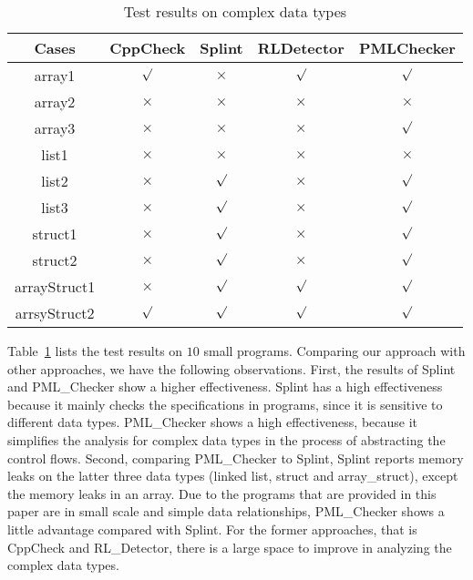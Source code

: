 \begin{table}[!h]
\center
\caption{Test results on complex data types}\label{tab:8}
\begin{tabular}{|c|c|c|c|c|}
\hline
\textbf{Cases}  & \textbf{CppCheck} & \textbf{Splint} & \textbf{RLDetector} & \textbf{PMLChecker}\\
\hline
array1	 &	$\surd$ & $\times$ & $\surd$ & $\surd$\\
\hline
array2  & $\times$ & $\times$ & $\times$ & $\times$ \\
\hline
array3	 & $\times$ &	$\times$ & $\times$ & $\surd$\\
\hline
list1 	& $\times$ &$\times$ & $\times$ & $\times$\\
\hline
list2	 & $\times$ & $\surd$ & $\times$ & $\surd$\\
\hline
list3	 &	$\times$	& $\surd$ & $\times$ & $\surd$\\
\hline
struct1	 & $\times$ & $\surd$ & $\times$ & $\surd$\\
\hline
struct2	 & $\times$ & $\surd$ & $\times$ & $\surd$\\
\hline
arrayStruct1	 & $\times$ & $\surd$ & $\surd$ & $\surd$\\
\hline
arrsyStruct2  & $\surd$ & $\surd$ & $\surd$& $\surd$\\
\hline
\end{tabular}
\end{table}


Table~\ref{tab:8} lists the test results on $10$ small programs. Comparing our approach with other approaches, we have the following observations.
First, %
the results of Splint and PML\_Checker show a higher effectiveness. Splint has a high effectiveness because it mainly checks the specifications in programs, since it is sensitive to different data types. PML\_Checker shows a high effectiveness, because it simplifies the analysis for complex data types in the process of abstracting the control flows.
Second, comparing PML\_Checker to Splint, Splint reports memory leaks on the latter three data types (linked list, struct and array\_struct), except the memory leaks in an array. Due to the programs that are provided in this paper are in small scale and simple data relationships, PML\_Checker shows a little advantage compared with Splint. For the former approaches, that is CppCheck and RL\_Detector, there is a large space to improve in analyzing the complex data types.

